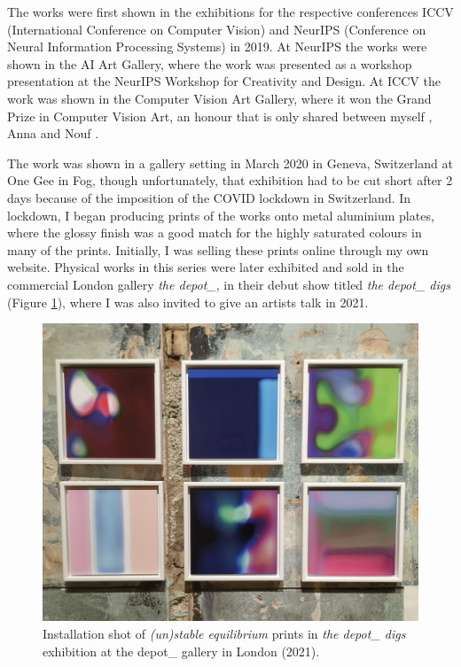 The works were first shown in the exhibitions for the respective conferences ICCV (International Conference on Computer Vision) and NeurIPS (Conference on Neural Information Processing Systems) in 2019. 
At NeurIPS the works were shown in the AI Art Gallery, where the work was presented as a workshop presentation at the NeurIPS Workshop for Creativity and Design. 
At ICCV the work was shown in the Computer Vision Art Gallery, where it won the Grand Prize in Computer Vision Art, an honour that is only shared between myself \citep{broad2019unstable}, Anna \citet{ridler2018mosaic} and Nouf \citet{aljowaysir2021salaf}.

The work was shown in a gallery setting in March 2020 in Geneva, Switzerland at One Gee in Fog, though unfortunately, that exhibition had to be cut short after 2 days because of the imposition of the COVID lockdown in Switzerland. 
In lockdown, I began producing prints of the works onto metal aluminium plates, where the glossy finish was a good match for the highly saturated colours in many of the prints. 
Initially, I was selling these prints online through my own website. Physical works in this series were later exhibited and sold in the commercial London gallery \textit{the depot\_}, in their debut show titled \textit{the depot\_ digs} \citep{depot2021digs} (Figure \ref{fig:c7:depot_digs}), where I was also invited to give an artists talk in 2021.

\begin{figure}[!htb]
    \centering
    \captionsetup{justification=centering}
    \includegraphics[width=1\textwidth]{figures/c7_impact/depot_cropped.png}
    \caption[Installation shot of \textit{(un)stable equilibrium} in the depot\_ gallery]{Installation shot of \textit{(un)stable equilibrium} prints in \textit{the depot\_ digs} exhibition at the depot\_ gallery in London (2021).}
    \label{fig:c7:depot_digs}
\end{figure}

